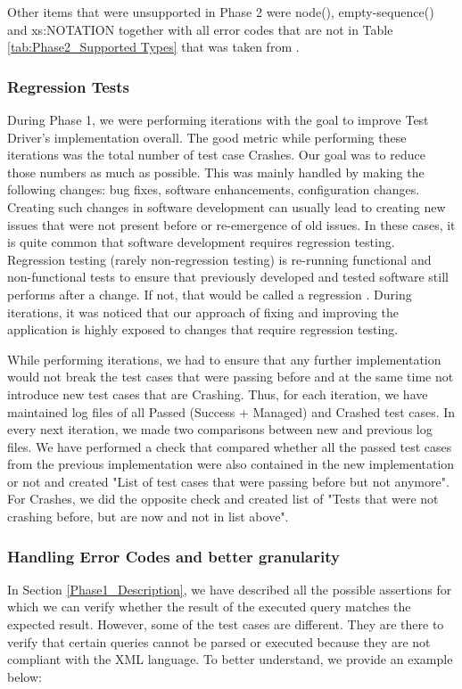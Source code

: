 Other items that were unsupported in Phase 2 were node(), empty-sequence() and xs:NOTATION together with all error codes that are not in Table \ref{tab:Phase2_Supported Types} that was taken from \cite{RumbleSupportedErrorCodes}.

\subsubsection{Regression Tests}
During Phase 1, we were performing iterations with the goal to improve Test Driver's implementation overall. The good metric while performing these iterations was the total number of test case Crashes. Our goal was to reduce those numbers as much as possible. This was mainly handled by making the following changes: bug fixes, software enhancements, configuration changes. Creating such changes in software development can usually lead to creating new issues that were not present before or re-emergence of old issues. In these cases, it is quite common that software development requires regression testing. Regression testing (rarely non-regression testing) is re-running functional and non-functional tests to ensure that previously developed and tested software still performs after a change. If not, that would be called a regression \cite{RegressionTesting}. During iterations, it was noticed that our approach of fixing and improving the application is highly exposed to changes that require regression testing. 

While performing iterations, we had to ensure that any further implementation would not break the test cases that were passing before and at the same time not introduce new test cases that are Crashing. Thus, for each iteration, we have maintained log files of all Passed (Success + Managed) and Crashed test cases. In every next iteration, we made two comparisons between new and previous log files. We have performed a check that compared whether all the passed test cases from the previous implementation were also contained in the new implementation or not and created "List of test cases that were passing before but not anymore". For Crashes, we did the opposite check and created list of "Tests that were not crashing before, but are now and not in list above". 

\subsubsection{Handling Error Codes and better granularity}
\label{Phase2_ErrorCodes}
In Section \ref{Phase1_Description}, we have described all the possible assertions for which we can verify whether the result of the executed query matches the expected result. However, some of the test cases are different. They are there to verify that certain queries cannot be parsed or executed because they are not compliant with the XML language. To better understand, we provide an example below:

